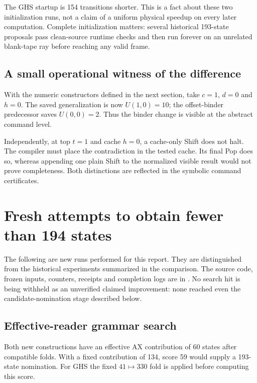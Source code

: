 \documentclass[10pt,a4paper]{article}
\begin{document}
The GHS startup is 154 transitions shorter. This is a fact about these
two initialization runs, not a claim of a uniform physical speedup on
every later computation. Complete initialization matters: several
historical 193-state proposals pass clean-source runtime checks and
then run forever on an unrelated blank-tape ray before reaching any
valid frame.

\subsection{A small operational witness of the difference}

With the numeric constructors defined in the next section, take
$c=1$, $d=0$ and $h=0$. The saved generalization is now $U(1,0)=10$;
the offset-binder predecessor saves $U(0,0)=2$. Thus the binder change
is visible at the abstract command level.

Independently, at top $t=1$ and cache $h=0$, a cache-only Shift does
not halt. The compiler must place the contradiction in the tested
cache. Its final Pop does so, whereas appending one plain Shift to
the normalized visible result would not prove completeness.
Both distinctions are reflected in the symbolic command certificates.




\section{Fresh attempts to obtain fewer than 194 states}
\label{sec:searches}

The following are new runs performed for this report. They are
distinguished from the historical experiments summarized in the
comparison. The source code, frozen inputs, counters, receipts and
completion logs are in . No search hit is being
withheld as an unverified claimed improvement: none reached even
the candidate-nomination stage described below.

\subsection{Effective-reader grammar search}

Both new constructions have an effective AX contribution of 60 states
after compatible folds. With a fixed contribution of 134, score 59
would supply a 193-state nomination. For GHS the fixed $41\mapsto330$
fold is applied before computing this score.
\end{document}
